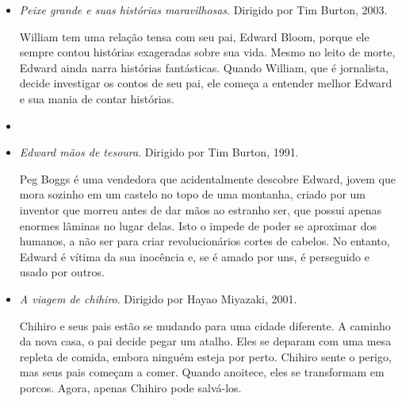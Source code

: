 \documentclass[11pt]{extarticle}
\begin{document}
\begin{itemize}
\item \textit{Peixe grande e suas histórias maravilhosas}. Dirigido por Tim Burton, 2003.

William tem uma relação tensa com seu pai, Edward Bloom, porque ele sempre contou histórias exageradas sobre sua vida. Mesmo no leito de morte, Edward ainda narra histórias fantásticas. Quando William, que é jornalista, decide investigar os contos de seu pai, ele começa a entender melhor Edward e sua mania de contar histórias.

\item \item \textit{Edward mãos de tesoura}. Dirigido por Tim Burton, 1991.

Peg Boggs é uma vendedora que acidentalmente descobre Edward, jovem que mora sozinho em um castelo no topo de uma montanha, criado por um inventor que morreu antes de dar mãos ao estranho ser, que possui apenas enormes lâminas no lugar delas. Isto o impede de poder se aproximar dos humanos, a não ser para criar revolucionários cortes de cabelos. No entanto, Edward é vítima da sua inocência e, se é amado por uns, é perseguido e usado por outros.

\item \textit{A viagem de chihiro}. Dirigido por Hayao Miyazaki, 2001.

Chihiro e seus pais estão se mudando para uma cidade diferente. A caminho da nova casa, o pai decide pegar um atalho. Eles se deparam com uma mesa repleta de comida, embora ninguém esteja por perto. Chihiro sente o perigo, mas seus pais começam a comer. Quando anoitece, eles se transformam em porcos. Agora, apenas Chihiro pode salvá-los.

\end{itemize}
\end{document}

